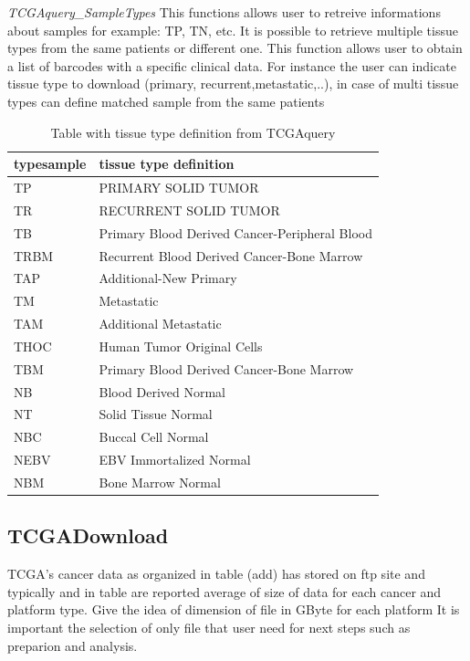 
\textit{TCGAquery\_SampleTypes} 
This functions allows user to retreive informations about samples for example: TP, TN, etc. %
It is possible to retrieve multiple tissue types from the same patients or different one.
This function allows user to obtain a list of barcodes with a specific clinical data. For instance the user can indicate tissue type to download (primary, recurrent,metastatic,..), in case of multi tissue types can define matched sample from the same patients
\begin{table}[!h]
\centering
\begin{tiny}
\begin{tabular}{ll}
  \hline
typesample &  tissue type definition \\ 
\hline
TP &   PRIMARY SOLID TUMOR \\
TR &   RECURRENT SOLID TUMOR \\
TB &   Primary Blood Derived Cancer-Peripheral Blood \\
TRBM & Recurrent Blood Derived Cancer-Bone Marrow \\
TAP &  Additional-New Primary \\
TM &   Metastatic \\
TAM &  Additional Metastatic \\
THOC & Human Tumor Original Cells \\
TBM &  Primary Blood Derived Cancer-Bone Marrow \\
NB &   Blood Derived Normal \\
NT &   Solid Tissue Normal \\
NBC &  Buccal Cell Normal \\
NEBV & EBV Immortalized Normal \\
NBM &  Bone Marrow Normal \\
  \hline
\end{tabular}
\end{tiny}
\caption{Table with tissue type definition from TCGAquery} 
\label{table:03}
\end{table}


\subsection{TCGADownload}
TCGA's cancer data as organized in table (add) has stored on ftp site and typically and in table are reported average of size of data for each cancer and platform type.
{\color{red} Give the idea of dimension of file in GByte for each platform}
It is important the selection of only file that user need for next steps such as preparion and analysis.

